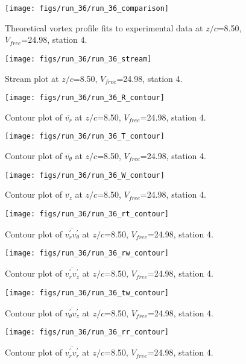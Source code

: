 \begin{figure}[H]
\centering
\texttt{[image: figs/run\_36/run\_36\_comparison]}
\caption{Theoretical vortex profile fits to experimental data at $z/c$=8.50, $V_{free}$=24.98, station 4.}
\end{figure}


\begin{figure}[H]
\centering
\texttt{[image: figs/run\_36/run\_36\_stream]}
\caption{Stream plot at $z/c$=8.50, $V_{free}$=24.98, station 4.}
\end{figure}


\begin{figure}[H]
\centering
\texttt{[image: figs/run\_36/run\_36\_R\_contour]}
\caption{Contour plot of $\overline{v_{r}}$ at $z/c$=8.50, $V_{free}$=24.98, station 4.}
\end{figure}


\begin{figure}[H]
\centering
\texttt{[image: figs/run\_36/run\_36\_T\_contour]}
\caption{Contour plot of $\overline{v_{\theta}}$ at $z/c$=8.50, $V_{free}$=24.98, station 4.}
\end{figure}


\begin{figure}[H]
\centering
\texttt{[image: figs/run\_36/run\_36\_W\_contour]}
\caption{Contour plot of $\overline{v_{z}}$ at $z/c$=8.50, $V_{free}$=24.98, station 4.}
\end{figure}


\begin{figure}[H]
\centering
\texttt{[image: figs/run\_36/run\_36\_rt\_contour]}
\caption{Contour plot of $\overline{v_{r}^{\prime} v_{\theta}^{\prime}}$ at $z/c$=8.50, $V_{free}$=24.98, station 4.}
\end{figure}


\begin{figure}[H]
\centering
\texttt{[image: figs/run\_36/run\_36\_rw\_contour]}
\caption{Contour plot of $\overline{v_{r}^{\prime} v_{z}^{\prime}}$ at $z/c$=8.50, $V_{free}$=24.98, station 4.}
\end{figure}


\begin{figure}[H]
\centering
\texttt{[image: figs/run\_36/run\_36\_tw\_contour]}
\caption{Contour plot of $\overline{v_{\theta}^{\prime} v_{z}^{\prime}}$ at $z/c$=8.50, $V_{free}$=24.98, station 4.}
\end{figure}


\begin{figure}[H]
\centering
\texttt{[image: figs/run\_36/run\_36\_rr\_contour]}
\caption{Contour plot of $\overline{v_{r}^{\prime} v_{r}^{\prime}}$ at $z/c$=8.50, $V_{free}$=24.98, station 4.}
\end{figure}


